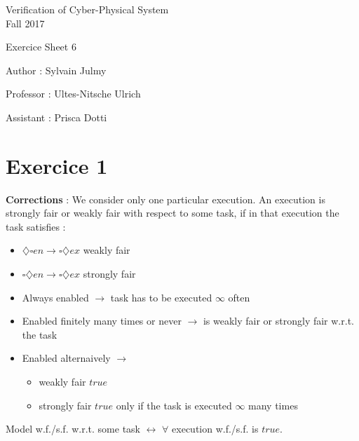 \documentclass[a4paper,11pt]{report}
\author{Sylvain Julmy}
\date{\today}
\newcommand*{\A}{\square}  %
\newcommand*{\D}{\diamondsuit} %
\begin{document}
\begin{center}
\Large{
    Verification of Cyber-Physical System\\
    Fall 2017
  }
  
  \noindent\makebox[\linewidth]{\rule{\linewidth}{0.4pt}}
  Exercice Sheet 6

  \vspace*{1.4cm}

  Author : Sylvain Julmy
  \noindent\makebox[\linewidth]{\rule{\linewidth}{0.4pt}}

  \begin{flushleft}
    Professor : Ultes-Nitsche Ulrich
    
    Assistant : Prisca Dotti
  \end{flushleft}

  \noindent\makebox[\linewidth]{\rule{\textwidth}{1pt}}
\end{center}

\section*{Exercice 1}

\textbf{Corrections} : We consider only one particular execution. An execution
is strongly fair or weakly fair with respect to some task, if in that execution
the task satisfies :
\begin{itemize}
\item $\D \A en \rightarrow \A \D ex$ weakly fair
\item $\A \D en \rightarrow \A \D ex$ strongly fair
\end{itemize}

\begin{itemize}
\item Always enabled $\rightarrow$ task has to be executed $\infty$ often
\item Enabled finitely many times or never $\rightarrow$ is weakly fair or
  strongly fair w.r.t. the task
\item Enabled alternaively $\rightarrow$
  \begin{itemize}
  \item weakly fair $true$
  \item strongly fair $true$ only if the task is executed $\infty$ many times
  \end{itemize}
\end{itemize}

Model w.f./s.f. w.r.t. some task $\leftrightarrow$ $\forall$ execution w.f./s.f.
is $true$.
\end{document}
